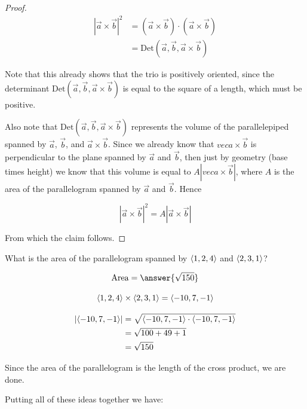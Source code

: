 \documentclass{ximera}
\begin{document}
\begin{proof}
	\begin{align*}
	|\vec{a} \times \vec{b}|^2  &=(\vec{a} \times \vec{b}) \cdot (\vec{a} \times \vec{b})\\
		&=\textrm{Det}(\vec{a},\vec{b},\vec{a} \times \vec{b})
	\end{align*}
	
	Note that this already shows that the trio is positively oriented, since the determinant $\textrm{Det}(\vec{a},\vec{b},\vec{a} \times \vec{b})$ is equal to the square of a length, which must be positive.
	
	Also note that $\textrm{Det}(\vec{a},\vec{b},\vec{a} \times \vec{b})$ represents the volume of the parallelepiped spanned by $\vec{a}$, $\vec{b}$, and $\vec{a} \times \vec{b}$.  Since we already know that $vec{a} \times \vec{b}$ is perpendicular to the plane spanned by $\vec{a}$ and $\vec{b}$, then just by geometry (base times height) we know that this volume is equal to $A |vec{a} \times \vec{b}|$, where $A$ is the area of the parallelogram spanned by $\vec{a}$ and $\vec{b}$.  Hence
	
	\[
	|\vec{a} \times \vec{b}|^2 = A |\vec{a} \times \vec{b}|
	\]
	
	From which the claim follows.
\end{proof}

\begin{question}
	What is the area of the parallelogram spanned by $\left\langle 1,2,4\right\rangle$ and $\left\langle 2,3,1\right\rangle$?
	
	\[
	\textrm{Area} = \answer{\sqrt{150}}
	\]
	
	\begin{hint}
		\[
		\left\langle 1,2,4\right\rangle \times \left\langle 2,3,1\right\rangle = \left\langle -10,7,-1\right\rangle
		\]
	\end{hint}
	
	
	\begin{hint}
		\begin{align*}
			\left| \left\langle -10,7,-1\right\rangle \right| &= \sqrt{ \left\langle -10,7,-1\right\rangle \cdot  \left\langle -10,7,-1\right\rangle}\\
				&=\sqrt{100+49+1}\\
				&=\sqrt{150}
		\end{align*}
		
		Since the area of the parallelogram is the length of the cross product, we are done.
	\end{hint}
\end{question}

Putting all of these ideas together we have:
\end{document}

